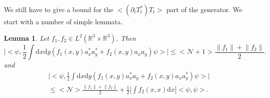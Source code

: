 \documentclass[11pt,a4paper]{scrartcl}
\newtheorem{lem}[thm]{Lemma}
\newcommand{\di}{\textrm{d}}		%
\newcommand{\Ncal}{\mathcal{N}}		%
\newcommand{\scal}[2]{\big<#1,#2\big>} %
\newcommand{\Rbb}{\mathbb{R}}		%
\newcommand{\norm}[1]{\lVert#1\rVert}	%
\newcommand{\ev}[1]{\big<#1\big>}	%
\newcommand{\bd}{\begin{displaymath}}			%
\newcommand{\ed}{\end{displaymath}}
\begin{document}
We still have to give a bound for the $\ev{(\partial_t T^*_t)T_t}$ part of the generator. We start with a number of simple lemmata.
\begin{lem}
\label{lm:Bbound}
Let $f_1, f_2 \in L^2(\Rbb^3\times \Rbb^3)$. Then
 \bd
\lvert \scal{\psi}{\frac{1}{2} \int \di x\di y \left( f_1(x,y) a^\ast_x a^\ast_y + f_2(x,y) a_x a_y \right) \psi} \rvert \leq \ev{\Ncal+1} \frac{\norm{f_1}+\norm{f_2}}{2}.
\ed
and
\begin{align*}
  & \lvert \scal{\psi}{\frac{1}{2} \int \di x\di y \left( f_1(x,y) a^\ast_x
a_y + f_2(x,y) a_x a^\ast_y \right)  \psi} \rvert \\
& \leq \ev{\Ncal} \frac{\norm{f_1}+\norm{f_2}}{2} + \frac{1}{2} \left\lvert \int f_2(x,x) \di x \right\rvert \scal{\psi}{\psi}.
\end{align*}
\end{lem}
\end{document}
